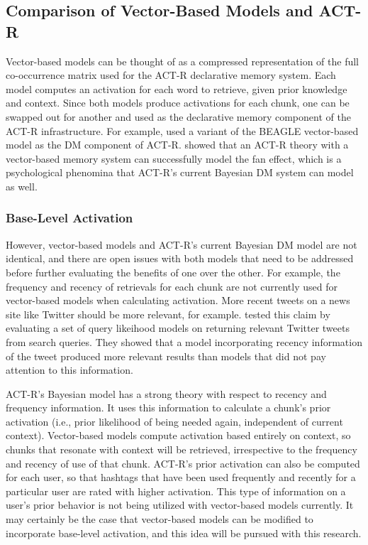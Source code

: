 \documentclass[man,floatsintext]{apa6}
\begin{document}
\subsection{Comparison of Vector-Based Models and ACT-R}

Vector-based models can be thought of as a compressed representation of the full co-occurrence matrix used for the ACT-R declarative memory system.
Each model computes an activation for each word to retrieve, given prior knowledge and context.
Since both models produce activations for each chunk, one can be swapped out for another and used as the declarative memory component of the ACT-R infrastructure.
For example, \textcite{Rutledge2007} used a variant of the BEAGLE vector-based model as the DM component of ACT-R.
\textcite{Rutledge2008} showed that an ACT-R theory with a vector-based memory system can successfully model the fan effect, which is a psychological phenomina that ACT-R's current Bayesian DM system can model as well.

\subsubsection{Base-Level Activation}

However, vector-based models and ACT-R's current Bayesian DM model are not identical, and there are open issues with both models that need to be addressed before further evaluating the benefits of one over the other.
For example, the frequency and recency of retrievals for each chunk are not currently used for vector-based models when calculating activation.
More recent tweets on a news site like Twitter should be more relevant, for example.
\textcite{Efron2011} tested this claim by evaluating a set of query likeihood models on returning relevant Twitter tweets from search queries.
They showed that a model incorporating recency information of the tweet produced more relevant results than models that did not pay attention to this information.

ACT-R's Bayesian model has a strong theory with respect to recency and frequency information.
It uses this information to calculate a chunk's prior activation (i.e., prior likelihood of being needed again, independent of current context).
Vector-based models compute activation based entirely on context, so chunks that resonate with context will be retrieved, irrespective to the frequency and recency of use of that chunk.
ACT-R's prior activation can also be computed for each user, so that hashtags that have been used frequently and recently for a particular user are rated with higher activation.
This type of information on a user's prior behavior is not being utilized with vector-based models currently.
It may certainly be the case that vector-based models can be modified to incorporate base-level activation, and this idea will be pursued with this research.
\end{document}
